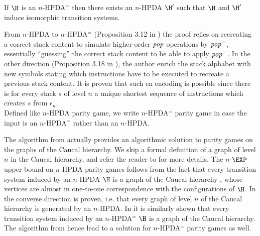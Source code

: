 \begin{theorem}{\cite{Woeh05, carayol2006automates}}
If $\H$ is an $n$-HPDA$^=$ then there
exists an $n$-HPDA $\H'$ such that
$\H$ and $\H'$ %
induce isomorphic transition systems.
\end{theorem}

\fi

From $n$-HPDA to $n$-HPDA$^=$ (Proposition 3.12 in \cite{Woeh05}) the proof relies on recreating a correct stack content to simulate higher-order 
$\text{\textit{pop}}$ operations by $\text{\textit{pop}}^=$, essentially ``guessing'' the correct stack content to be able to apply $\text{\textit{pop}}^=$. 
In the other direction (Proposition 3.18 in \cite{Woeh05}), 
the author
enrich the stack alphabet with new symbols stating which 
instructions have to be executed to recreate a
previous stack content. It is proven that such en encoding is possible since
there is 
for every stack $s$ of level $n$
 a unique shortest sequence of instructions which creates $s$ from
$\epsilon_n$. \\

Defined like {\sc $n$-HPDA parity game}, we write {\sc $n$-HPDA$^=$ parity game}  
in case the input is an $n$-HPDA$^=$ rather than an $n$-HPDA.



The algorithm from \cite{Cach03} actually provides an algorithmic solution to parity games on the graphs of the Caucal hierarchy. 
We skip a formal definition of a graph of level $n$ in the Caucal hierarchy, and refer the reader
to \cite{Cau02mfcs} for more details.
The $n$-$\EXP$ upper bound on $n$-HPDA parity games follows from the fact that every transition system induced by an $n$-HPDA $\H$ is a graph of the Caucal hierarchy \cite{Cach03, Woeh05},
whose vertices are almost in one-to-one correspondence with the configurations of $\H$.
In \cite{Woeh05} the converse direction is proven, i.e. that every graph of level $n$
of the Caucal hierarchy is generated by an $n$-HPDA.  
%
%
In \cite{carayol2006automates}
it is similarly shown that
every transition system induced by an $n$-HPDA$^=$ $\H$ is a graph of the Caucal hierarchy.
%
%
The algorithm from \cite{Cach03} hence lead to a solution for
$n$-HPDA$^=$ parity games as well.



